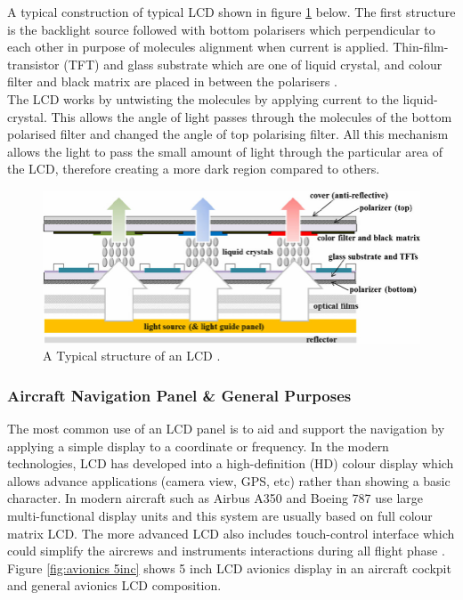 \noindent A typical construction of typical LCD shown in figure \ref{fig:LCD structure} below. The first structure is the backlight source followed with bottom polarisers which perpendicular to each other in purpose of molecules alignment when current is applied. Thin-film-transistor (TFT) and glass substrate which are one of liquid crystal, and colour filter and black matrix are placed in between the polarisers \cite{AnonymousLCDApplications}. \\ 

\noindent The LCD works by untwisting the molecules by applying current to the liquid-crystal. This allows the angle of light passes through the molecules of the bottom polarised filter and changed the angle of top polarising filter. All this mechanism allows the light to pass the small amount of light through the particular area of the LCD, therefore creating a more dark region compared to others.

\begin{figure}[!ht]
    \centering
    \includegraphics[scale=0.45]{Figures/LCD_Typical structure.png}
    \caption{A Typical structure of an LCD \cite{Park2013EfficiencyPrograms}.}
    \label{fig:LCD structure}
\end{figure}

\subsubsection{Aircraft Navigation Panel \& General Purposes}
The most common use of an LCD panel is to aid and support the navigation by applying a simple display to a coordinate or frequency. In the modern technologies, LCD has developed into a  high-definition (HD) colour display which allows advance applications (camera view, GPS, etc)  rather than showing a basic character. In modern aircraft such as Airbus A350 and Boeing 787 use large multi-functional display units \cite{AnonymousTouchAirbus} and this system are usually based on full colour matrix LCD.  The more advanced LCD also includes touch-control interface which could simplify the aircrews and instruments interactions during all flight phase \cite{AnonymousTouchAirbus}. Figure \ref{fig:avionics 5inc} shows 5 inch LCD avionics display in an aircraft cockpit and general avionics LCD composition.\\

